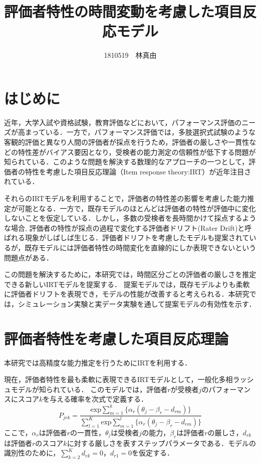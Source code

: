 \documentclass[dvipdfmx, twocolumn, a4paper]{hcresume}
\title{\bf 評価者特性の時間変動を考慮した項目反応モデル}
\author{1810519　林真由}
\begin{document}
\maketitle
\pagestyle{empty}
\thispagestyle{empty}
\section{はじめに}
近年，大学入試や資格試験，教育評価などにおいて，パフォーマンス評価のニーズが高まっている．一方で，パフォーマンス評価では，多肢選択式試験のような客観的評価と異なり人間の評価者が採点を行うため，評価者の厳しさや一貫性などの特性差がバイアス要因となり，受検者の能力測定の信頼性が低下する問題が知られている．このような問題を解決する数理的なアプローチの一つとして，評価者の特性を考慮した項目反応理論（Item response theory:IRT）\cite{IRTLord}が近年注目されている．

それらのIRTモデルを利用することで，評価者の特性差の影響を考慮した能力推定が可能となる．一方で，既存モデルのほとんどは評価者の特性が評価中に変化しないことを仮定している．しかし，多数の受検者を長時間かけて採点するような場合,
評価者の特性が採点の過程で変化する評価者ドリフト(Rater Drift)と呼ばれる現象がしばしば生じる．評価者ドリフトを考慮したモデルも提案されているが，既存モデルには評価者特性の時間変化を直線的にしか表現できないという問題点がある．

この問題を解決するために，本研究では，時間区分ごとの評価者の厳しさを推定できる新しいIRTモデルを提案する．
提案モデルでは，既存モデルよりも柔軟に評価者ドリフトを表現でき，モデルの性能が改善すると考えられる．本研究では，シミュレーション実験と実データ実験を通して提案モデルの有効性を示す．

\section{評価者特性を考慮した項目反応理論}
本研究では高精度な能力推定を行うためにIRTを利用する．

現在，評価者特性を最も柔軟に表現できるIRTモデルとして，一般化多相ラッシュモデルが知られている\cite{g-MFRM}．
このモデルでは，評価者$r$が受検者$j$のパフォーマンスにスコア$k$を与える確率を次式で定義する．
\begin{equation}
  P_{jrk}=\frac{\mathrm{exp}\sum_{m=1}^{k}\{\alpha_r(\theta_{j}-\beta_{r}-d_{rm})\}}{\sum_{l=1}^{K}\mathrm{exp}\sum_{m=1}^{l}\{\alpha_r(\theta_{j}-\beta_{r}-d_{rm})\}}
\end{equation}
ここで，$\alpha_r$は評価者$r$の一貫性，$\theta_j$は受検者$j$の能力，$\beta_r$は評価者$r$の厳しさ，$d_{rk}$は評価者$r$のスコア$k$に対する厳しさを表すステップパラメータである．モデルの識別性のために，$\sum^{K}_{k=2}{d_{rk}}=0$，$d_{r1}=0$を仮定する．
\end{document}
